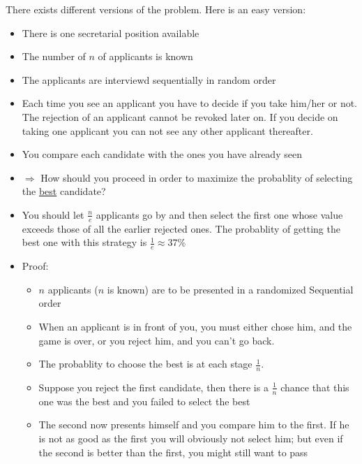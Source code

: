 \begin{example}
    There exists different versions of the problem. Here is an easy version:
    \begin{itemize}
        \item There is one secretarial position available
        \item The number of $n$ of applicants is known
        \item The applicants are interviewd sequentially in random order
        \item Each time you see an applicant you have to decide if you take him/her
            or not. The rejection of an applicant cannot be revoked later on. If
            you decide on taking one applicant you can not see any other applicant
            thereafter.
        \item You compare each candidate with the ones you have already seen
        \item $\Rightarrow$ How should you proceed in order to maximize the probablity
            of selecting the \underline{best} candidate?
        \item You should let $\frac{n}{e}$ applicants go by and then select the first
            one whose value exceeds those of all the earlier rejected ones. The probablity
            of getting the best one with this strategy is $\frac{1}{e} \approx 37\%$
        \item Proof:
            \begin{itemize}
                \item $n$ applicants ($n$ is known) are to be presented in a randomized
                    Sequential order
                \item When an applicant is in front of you, you must either chose him,
                    and the game is over, or you reject him, and you can't go back.
                \item The probablity to choose the best is at each stage $\frac{1}{n}$.
                \item Suppose you reject the first candidate, then there is a $\frac{1}{n}$
                    chance that this one was the best and you failed to select the best
                \item The second now presents himself and you compare him to the first. If
                    he is not as good as the first you will obviously not select him; but
                    even if the second is better than the first, you might still want to pass

\end{itemize}
\end{itemize}
\end{example}
